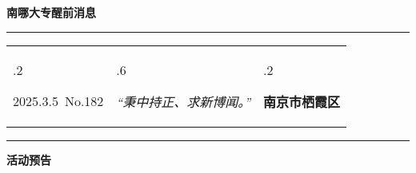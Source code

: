 \documentclass[letterpaper, 12pt]{article}
\begin{document}
\begin{center}
    \Huge\textbf{南哪大专醒前消息}
\end{center}
\vspace{4mm}
\hrule
\renewcommand\tabularxcolumn[1]{m{#1}}
\begin{tabularx}{\textwidth}{>{\hsize.2\hsize}X>{\hsize.6\hsize}X>{\hsize.2\hsize}X}
    \begin{flushleft}
        2025.3.5\, No.182
    \end{flushleft}
    &
    \begin{center}
        \textit{“秉中持正、求新博闻。”}
    \end{center}
    &
    \begin{flushright}
        \textbf{南京市栖霞区}
    \end{flushright}
\end{tabularx}
\vspace{-3.5mm}
\hrule
\vspace{4mm}
\centerline{\huge\textbf{活动预告}}
\end{document}
